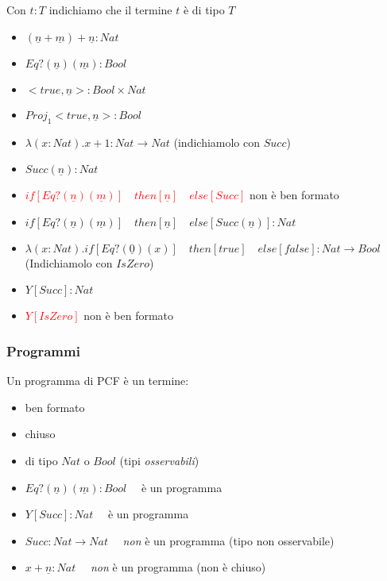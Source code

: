 \documentclass{beamer}
\begin{document}
\begin{frame}
	Con $t:T$ indichiamo che il termine $t$ è di tipo $T$
	\begin{example}
		\begin{itemize}
			\item $(\underline{n} + \underline{m})+ \underline{n} :Nat$
			\item $Eq?(\underline{n})(\underline{m}):Bool$
			\item $<true,\underline{n}>:Bool \times Nat$
			\item $Proj_1 <true,\underline{n}>:Bool$
			\item $\lambda (x:Nat) . x+1 : Nat\rightarrow Nat$ (indichiamolo con $Succ$)
			\item $Succ(\underline{n}):Nat$
			\item \textcolor{red}{$if[Eq?(\underline{n})(\underline{m})]\quad then [\underline{n}]
			\quad else[Succ]$} non è ben formato
			\item $if[Eq?(\underline{n})(\underline{m})]\quad then [\underline{n}]
			\quad else[ Succ(\underline{n}) ] :Nat$
			\item $\lambda(x:Nat).if[Eq?(\underline{0})(x)]\quad then [true]
			\quad else [false]: Nat \rightarrow Bool$ (Indichiamolo con $IsZero$)
			\item $Y [Succ]:Nat$
			\item \textcolor{red}{$Y[IsZero]$} non è ben formato
		\end{itemize}

	\end{example}

	
\end{frame}




\begin{frame}
	
	\frametitle{Programmi}
	
	Un programma di PCF è un termine:
	\begin{itemize}
		\item ben formato
		\item chiuso
		\item di tipo $Nat$ o $Bool$ (tipi \emph{osservabili})
	\end{itemize}

	
	\begin{example}
		\begin{itemize}
			\item $Eq?(\underline{n})(\underline{m}):Bool\quad$ è un programma
			\item $Y [Succ]:Nat\quad$ è un programma
			\item $Succ:Nat\rightarrow Nat\quad$ \emph{non} è un programma (tipo non osservabile)
			\item $x+\underline{n}:Nat\quad$ \emph{non} è un programma (non è chiuso)
		\end{itemize}

	\end{example}
	
\end{frame}
\end{document}
